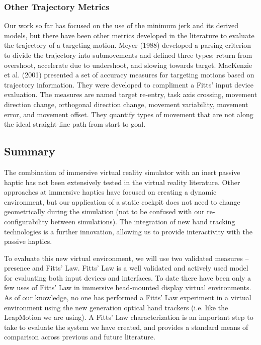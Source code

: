 \subsubsection{Other Trajectory Metrics}\label{other-trajectory-metrics}

Our work so far has focused on the use of the minimum jerk and its derived models, but there have been other metrics developed in the literature to evaluate the trajectory of a targeting motion. Meyer (1988) developed a parsing criterion to divide the trajectory into submovements and defined three types: return from overshoot, accelerate due to undershoot, and slowing towards target. MacKenzie et al. (2001) presented a set of accuracy measures for targeting motions based on trajectory information. They were developed to compliment a Fitts' input device evaluation. The measures are named target re-entry, task axis crossing, movement direction change, orthogonal direction change, movement variability, movement error, and movement offset. They quantify types of movement that are not along the ideal straight-line path from start to goal.

\subsection{Summary}
\label{summary}

The combination of immersive virtual reality simulator with an inert passive haptic has not been extensively tested in the virtual reality literature. Other approaches at immersive haptics have focused on creating a dynamic environment, but our application of a static cockpit does not need to change geometrically during the simulation (not to be confused with our re-configurability between simulations). The integration of new hand tracking technologies is a further innovation, allowing us to provide interactivity with the passive haptics.

To evaluate this new virtual environment, we will use two validated measures -- presence and Fitts' Law. Fitts' Law is a well validated and actively used model for evaluating both input devices and interfaces. To date there have been only a few uses of Fitts' Law in immersive head-mounted display virtual environments. As of our knowledge, no one has performed a Fitts' Law experiment in a virtual environment using the new generation optical hand trackers (i.e. like the LeapMotion we are using). A Fitts' Law characterization is an important step to take to evaluate the system we have created, and provides a standard means of comparison across previous and future literature.

